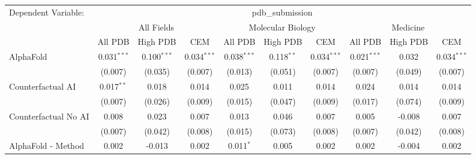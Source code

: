 \begingroup
\centering
\begin{tabular}{lccccccccc}
   \tabularnewline \midrule \midrule
   Dependent Variable: & \multicolumn{9}{c}{pdb\_submission}\\
 & \multicolumn{3}{c}{All Fields} & \multicolumn{3}{c}{Molecular Biology} & \multicolumn{3}{c}{Medicine} \\
\cmidrule(lr){2-7} \cmidrule(lr){5-10} \cmidrule(lr){8-7}
 & \multicolumn{1}{c}{All PDB} & \multicolumn{1}{c}{High PDB} & \multicolumn{1}{c}{CEM} & \multicolumn{1}{c}{All PDB} & \multicolumn{1}{c}{High PDB} & \multicolumn{1}{c}{CEM} & \multicolumn{1}{c}{All PDB} & \multicolumn{1}{c}{High PDB} & \multicolumn{1}{c}{CEM} \\
\cmidrule(lr){2-3} \cmidrule(lr){3-4} \cmidrule(lr){4-5} \cmidrule(lr){5-6} \cmidrule(lr){6-7} \cmidrule(lr){7-8} \cmidrule(lr){8-9} \cmidrule(lr){9-10} \cmidrule(lr){10-3}
   AlphaFold                                                   & 0.031$^{***}$  & 0.100$^{***}$  & 0.034$^{***}$ & 0.038$^{***}$ & 0.118$^{**}$   & 0.034$^{***}$ & 0.021$^{***}$ & 0.032         & 0.034$^{***}$\\   
                                                               & (0.007)        & (0.035)        & (0.007)       & (0.013)       & (0.051)        & (0.007)       & (0.007)       & (0.049)       & (0.007)\\   
   Counterfactual AI                                           & 0.017$^{**}$   & 0.018          & 0.014         & 0.025         & 0.011          & 0.014         & 0.024         & 0.014         & 0.014\\   
                                                               & (0.007)        & (0.026)        & (0.009)       & (0.015)       & (0.047)        & (0.009)       & (0.017)       & (0.074)       & (0.009)\\   
   Counterfactual No AI                                        & 0.008          & 0.023          & 0.007         & 0.013         & 0.046          & 0.007         & 0.005         & -0.008        & 0.007\\   
                                                               & (0.007)        & (0.042)        & (0.008)       & (0.015)       & (0.073)        & (0.008)       & (0.007)       & (0.042)       & (0.008)\\   
   AlphaFold - Method                                          & 0.002          & -0.013         & 0.002         & 0.011$^{*}$   & 0.005          & 0.002         & 0.002         & -0.004        & 0.002\\   

\end{tabular}
